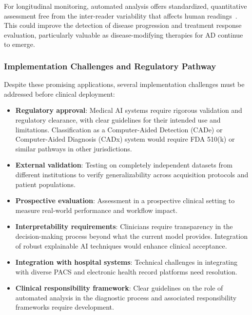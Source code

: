 \documentclass[12pt, a4paper]{article}
\begin{document}
For longitudinal monitoring, automated analysis offers standardized, quantitative assessment free from the inter-reader variability that affects human readings~\cite{kloppel2008accuracy}. This could improve the detection of disease progression and treatment response evaluation, particularly valuable as disease-modifying therapies for AD continue to emerge.

\subsubsection{Implementation Challenges and Regulatory Pathway}

Despite these promising applications, several implementation challenges must be addressed before clinical deployment:

\begin{itemize}
    \item \textbf{Regulatory approval}: Medical AI systems require rigorous validation and regulatory clearance, with clear guidelines for their intended use and limitations. Classification as a Computer-Aided Detection (CADe) or Computer-Aided Diagnosis (CADx) system would require FDA 510(k) or similar pathways in other jurisdictions.
    
    \item \textbf{External validation}: Testing on completely independent datasets from different institutions to verify generalizability across acquisition protocols and patient populations.
    
    \item \textbf{Prospective evaluation}: Assessment in a prospective clinical setting to measure real-world performance and workflow impact.
    
    \item \textbf{Interpretability requirements}: Clinicians require transparency in the decision-making process beyond what the current model provides. Integration of robust explainable AI techniques would enhance clinical acceptance.
    
    \item \textbf{Integration with hospital systems}: Technical challenges in integrating with diverse PACS and electronic health record platforms need resolution.
    
    \item \textbf{Clinical responsibility framework}: Clear guidelines on the role of automated analysis in the diagnostic process and associated responsibility frameworks require development.
\end{itemize}
\end{document}
